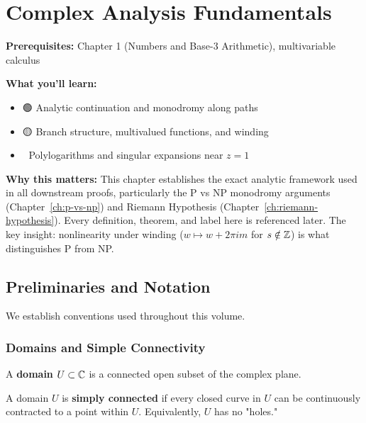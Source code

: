 \chapter{Complex Analysis Fundamentals}
\label{ch:complex}

\begin{chapterobjectives}
\textbf{Prerequisites:} Chapter 1 (Numbers and Base-3 Arithmetic), multivariable calculus

\textbf{What you'll learn:}
\begin{itemize}
\item 🟢 Analytic continuation and monodromy along paths
\item 🟡 Branch structure, multivalued functions, and winding
\item 🔴 Polylogarithms and singular expansions near $z=1$
\end{itemize}

\textbf{Why this matters:} This chapter establishes the exact analytic framework used in all downstream proofs, particularly the P vs NP monodromy arguments (Chapter~\ref{ch:p-vs-np}) and Riemann Hypothesis (Chapter~\ref{ch:riemann-hypothesis}). Every definition, theorem, and label here is referenced later. The key insight: nonlinearity under winding ($w \mapsto w + 2\pi i m$ for $s \notin \mathbb{Z}$) is what distinguishes P from NP.
\end{chapterobjectives}

\section{Preliminaries and Notation}
\label{sec:preliminaries}

We establish conventions used throughout this volume.

\subsection{Domains and Simple Connectivity}

\begin{definition}[Domain]
A \textbf{domain} $U \subset \mathbb{C}$ is a connected open subset of the complex plane.
\end{definition}

\begin{definition}
A domain $U$ is \textbf{simply connected} if every closed curve in $U$ can be continuously contracted to a point within $U$. Equivalently, $U$ has no "holes."
\end{definition}

